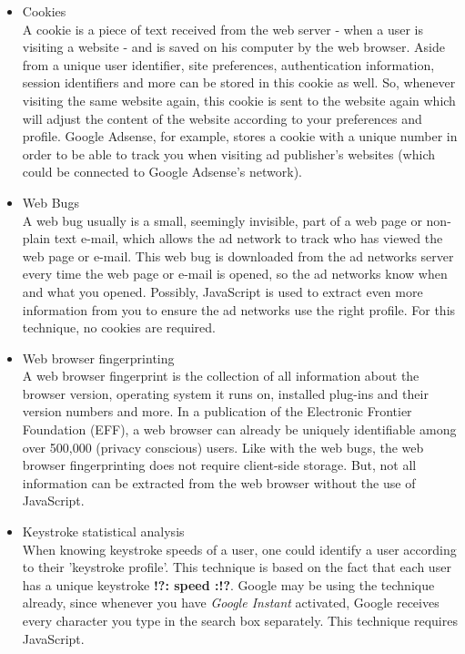 \documentclass[11pt]{article}
\newcommand{\tocheck}[1]{{\bf !?: #1 :!?}}
\begin{document}
\begin{itemize}
	\item Cookies\\
		A cookie is a piece of text received from the web server - when a user is visiting a website - and is saved on his computer by the web browser. Aside from a unique user identifier, site preferences, authentication information, session identifiers and more can be stored in this cookie as well. So, whenever visiting the same website again, this cookie is sent to the website again which will adjust the content of the website according to your preferences and profile. Google Adsense, for example, stores a cookie with a unique number in order to be able to track you when visiting ad publisher's websites (which could be connected to Google Adsense's network). \cite{Adsense2011}

	\item Web Bugs\\
		A web bug usually is a small, seemingly invisible, part of a web page or non-plain text e-mail, which allows the ad network to track who has viewed the web page or e-mail. This web bug is downloaded from the ad networks server every time the web page or e-mail is opened, so the ad networks know when and what you opened. Possibly, JavaScript is used to extract even more information from you to ensure the ad networks use the right profile. For this technique, no cookies are required.

	\item Web browser fingerprinting\\
		A web browser fingerprint is the collection of all information about the browser version, operating system it runs on, installed plug-ins and their version numbers and more. In a publication of the Electronic Frontier Foundation (EFF), a web browser can already be uniquely identifiable among over 500,000 (privacy conscious) users. \cite{EFF2010} Like with the web bugs, the web browser fingerprinting does not require client-side storage. But, not all information can be extracted from the web browser without the use of JavaScript.

	\item Keystroke statistical analysis\\
		When knowing keystroke speeds of a user, one could identify a user according to their 'keystroke profile'. This technique is based on the fact that each user has a unique keystroke \tocheck{speed}. Google may be using the technique already, since whenever you have \textit{Google Instant} activated, Google receives every character you type in the search box separately. \cite{GoogleInstant} This technique requires JavaScript. 
\end{itemize}
\end{document}
